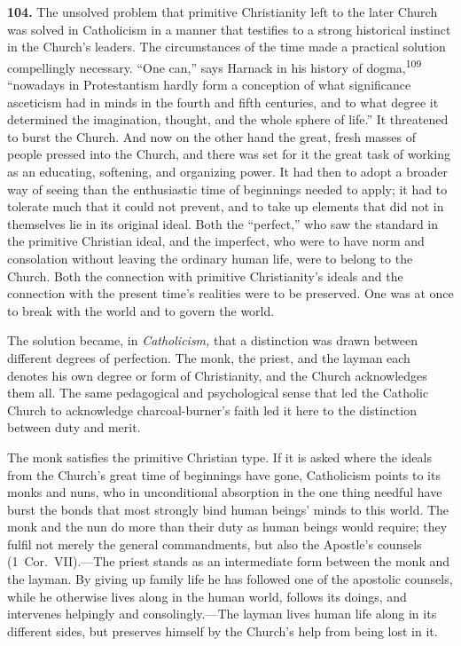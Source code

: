 \documentclass[12pt,a4paper]{book}
\newcommand{\opage}[1]{\marginnote{\footnotesize\textit{[#1]}}}
\begin{document}
\noindent\textbf{104.} The unsolved problem that primitive Christianity left to the later Church was solved in
Catholicism in a manner that testifies to a strong historical instinct in the Church's leaders. The
circumstances of the time made a practical solution compellingly necessary. ``One can,'' says Harnack in his
history of dogma,\textsuperscript{109} ``nowadays in Protestantism hardly form a conception of what significance
asceticism had in minds in the fourth and fifth centuries, and to what degree it determined the imagination,
thought, and the whole sphere of life.'' It threatened to burst the Church. And now on the other hand the
great, fresh masses of people pressed into the Church, and there was set for it the great task of working as an
educating, softening, and organizing power. It had then to adopt a broader way of seeing than the enthusiastic
time of beginnings needed to apply; it had to tolerate much that it could not prevent, and to take up elements
that did not in themselves lie in its original ideal. Both the ``perfect,'' who saw the standard in the
primitive Christian ideal, and the imperfect, who were to have norm and consolation without leaving the ordinary
human life, were to belong to the Church. Both the connection with primitive Christianity's ideals and the
connection with the present time's realities were to be preserved. One was at once to break with the world and
to govern the world.

The solution became, in \emph{Catholicism,} that a distinction was drawn between different degrees of
perfection. The monk, the priest, and the layman each denotes his own degree or form of Christianity, and the
Church acknowledges them all. The same pedagogical and psychological sense that led the Catholic Church to
acknowledge charcoal-burner's faith led it here to the distinction between duty and merit.

The monk satisfies the primitive Christian type. If it is asked where the ideals from the Church's great time of
beginnings have gone, Catholicism points to its monks and nuns, who in unconditional absorption in the one thing
needful have burst the bonds that most strongly bind human beings' minds to this world. The monk and the nun do
more than their duty as human beings would require; they fulfil not merely the general commandments, but also the
Apostle's counsels (1~Cor.\ VII).---The priest stands as an intermediate form between the monk and the layman. By
giving up family life he has followed one of the apostolic counsels, while he otherwise lives along in the human
world, follows its doings, and intervenes helpingly and 
\opage{233}consolingly.---The layman lives human life along in its
different sides, but preserves himself by the Church's help from being lost in it.
\end{document}

